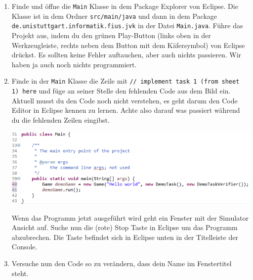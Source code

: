 \begin{enumerate}
    \item Finde und öffne die \texttt{Main} Klasse in dem Package Explorer von Eclipse.
        Die Klasse ist in dem Ordner \texttt{src/main/java} und dann in dem Package \texttt{de.unistuttgart.informatik.fius.jvk} in der Datei \texttt{Main.java}.
        Führe das Projekt aus, indem du den grünen Play-Button (links oben in der Werkzeugleiste, rechts neben dem Button mit dem Käfersymbol) von Eclipse drückst. 
        Es sollten keine Fehler auftauchen, aber auch nichts passieren. %
        Wir haben ja auch noch nichts programmiert.
    \item Finde in der \lstinline{Main} Klasse die Zeile mit \lstinline{// implement task 1 (from sheet 1) here} und füge an seiner Stelle den fehlenden Code aus dem Bild ein.
        Aktuell musst du den Code noch nicht verstehen, es geht darum den Code Editor in Eclipse kennen zu lernen. 
        Achte also darauf was passiert während du die fehlenden Zeilen eingibst.

        \includegraphics[width=\linewidth]{./figures/code.1.png}

        Wenn das Programm jetzt ausgeführt wird geht ein Fenster mit der Simulator Ansicht auf.
        Suche nun die (rote) Stop Taste in Eclipse um das Programm abzubrechen.
        Die Taste befindet sich in Eclipse unten in der Titelleiste der Console.
    \item Versuche nun den Code so zu verändern, dass dein Name im Fenstertitel steht.
\end{enumerate}


